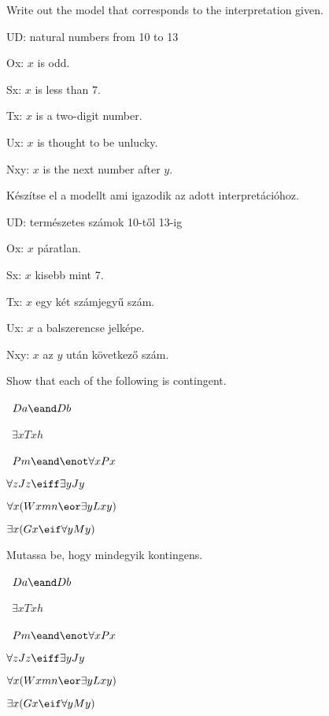\solutions
\problempart
\label{pr.InterpretationToModel}
Write out the model that corresponds to the interpretation given.
\begin{ekey}
\item{UD:} natural numbers from 10 to 13
\item{Ox:} $x$ is odd. 
\item{Sx:} $x$ is less than 7.
\item{Tx:} $x$ is a two-digit number.
\item{Ux:} $x$ is thought to be unlucky.
\item{Nxy:} $x$ is the next number after $y$.
\end{ekey}
\solutions
\problempart
\label{pr.InterpretationToModel}
Készítse el a modellt ami igazodik az adott interpretációhoz.
\begin{ekey}
\item{UD:} természetes számok 10-től 13-ig
\item{Ox:} $x$ páratlan. 
\item{Sx:} $x$ kisebb mint 7.
\item{Tx:} $x$ egy két számjegyű szám.
\item{Ux:} $x$ a balszerencse jelképe.
\item{Nxy:} $x$ az $y$ után következő szám.
\end{ekey}

\problempart
\label{pr.Contingent}
Show that each of the following is contingent.
\begin{earg}
\item \leftsolutions\ $Da \eand Db$
\item \leftsolutions\ $\exists x Txh$
\item \leftsolutions\ $Pm \eand \enot\forall x Px$
\item $\forall z Jz \eiff \exists y Jy$
\item $\forall x (Wxmn \eor \exists yLxy)$
\item $\exists x (Gx \eif \forall y My)$
\end{earg}
\problempart
\label{pr.Contingent}

Mutassa be, hogy mindegyik kontingens.
\begin{earg}
\item \leftsolutions\ $Da \eand Db$
\item \leftsolutions\ $\exists x Txh$
\item \leftsolutions\ $Pm \eand \enot\forall x Px$
\item $\forall z Jz \eiff \exists y Jy$
\item $\forall x (Wxmn \eor \exists yLxy)$
\item $\exists x (Gx \eif \forall y My)$
\end{earg}

